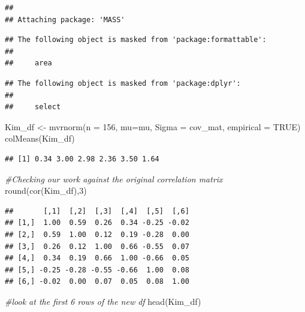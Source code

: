 \documentclass[
]{book}
\newenvironment{Shaded}{\begin{snugshade}}{\end{snugshade}}
\newcommand{\AttributeTok}[1]{\textcolor[rgb]{0.77,0.63,0.00}{#1}}
\newcommand{\CommentTok}[1]{\textcolor[rgb]{0.56,0.35,0.01}{\textit{#1}}}
\newcommand{\ConstantTok}[1]{\textcolor[rgb]{0.00,0.00,0.00}{#1}}
\newcommand{\DecValTok}[1]{\textcolor[rgb]{0.00,0.00,0.81}{#1}}
\newcommand{\FunctionTok}[1]{\textcolor[rgb]{0.00,0.00,0.00}{#1}}
\newcommand{\NormalTok}[1]{#1}
\newcommand{\OtherTok}[1]{\textcolor[rgb]{0.56,0.35,0.01}{#1}}
\begin{document}
\begin{verbatim}
## 
## Attaching package: 'MASS'
\end{verbatim}

\begin{verbatim}
## The following object is masked from 'package:formattable':
## 
##     area
\end{verbatim}

\begin{verbatim}
## The following object is masked from 'package:dplyr':
## 
##     select
\end{verbatim}

\begin{Shaded}
\begin{Highlighting}[]
\NormalTok{Kim\_df }\OtherTok{\textless{}{-}} \FunctionTok{mvrnorm}\NormalTok{(}\AttributeTok{n =} \DecValTok{156}\NormalTok{, }\AttributeTok{mu=}\NormalTok{mu, }\AttributeTok{Sigma =}\NormalTok{ cov\_mat, }\AttributeTok{empirical =} \ConstantTok{TRUE}\NormalTok{)}
\FunctionTok{colMeans}\NormalTok{(Kim\_df)}
\end{Highlighting}
\end{Shaded}

\begin{verbatim}
## [1] 0.34 3.00 2.98 2.36 3.50 1.64
\end{verbatim}

\begin{Shaded}
\begin{Highlighting}[]
\CommentTok{\#Checking our work against the original correlation matrix}
\FunctionTok{round}\NormalTok{(}\FunctionTok{cor}\NormalTok{(Kim\_df),}\DecValTok{3}\NormalTok{)}
\end{Highlighting}
\end{Shaded}

\begin{verbatim}
##       [,1]  [,2]  [,3]  [,4]  [,5]  [,6]
## [1,]  1.00  0.59  0.26  0.34 -0.25 -0.02
## [2,]  0.59  1.00  0.12  0.19 -0.28  0.00
## [3,]  0.26  0.12  1.00  0.66 -0.55  0.07
## [4,]  0.34  0.19  0.66  1.00 -0.66  0.05
## [5,] -0.25 -0.28 -0.55 -0.66  1.00  0.08
## [6,] -0.02  0.00  0.07  0.05  0.08  1.00
\end{verbatim}

\begin{Shaded}
\begin{Highlighting}[]
\CommentTok{\#look at the first 6 rows of the new df}
\FunctionTok{head}\NormalTok{(Kim\_df)}
\end{Highlighting}
\end{Shaded}
\end{document}
